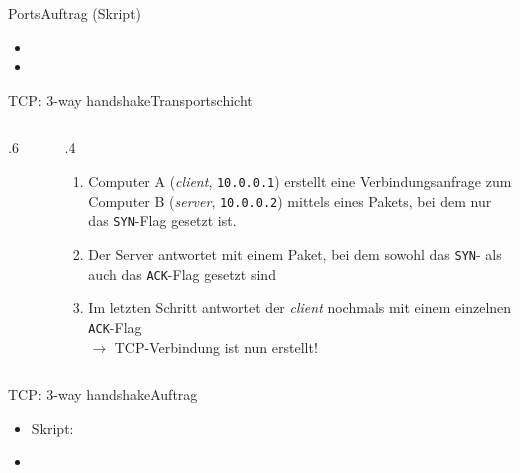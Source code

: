 \begin{frame}{\faShip{} Ports}{Auftrag (Skript)}
    \begin{itemize}
        \item {}
        \item {}
    \end{itemize}
\end{frame}

\begin{frame}[fragile]{\faHandshake{} \acrshort{TCP}: 3-way handshake}{Transportschicht}
    \begin{columns}[c]
        \begin{column}{.6\textwidth}
            \begin{figure}[H]
                \centering
            \end{figure}
        \end{column}\vrule{}
        \begin{column}{.4\textwidth}
            \footnotesize
            \begin{enumerate}
                \item Computer A (\textit{client}, \texttt{10.0.0.1}) erstellt eine Verbindungsanfrage zum Computer B (\textit{server}, \texttt{10.0.0.2}) mittels eines Pakets, bei dem nur das \texttt{SYN}-Flag gesetzt ist.
                \item Der Server antwortet mit einem Paket, bei dem sowohl das \texttt{SYN}- als auch das \texttt{ACK}-Flag gesetzt sind
                \item Im letzten Schritt antwortet der \textit{client} nochmals mit einem einzelnen \texttt{ACK}-Flag\\
                      $\rightarrow$ \acrshort{TCP}-Verbindung ist nun erstellt!
            \end{enumerate}
        \end{column}
    \end{columns}
\end{frame}

\begin{frame}[fragile]{\faHandshake{} \acrshort{TCP}: 3-way handshake}{Auftrag}
    \begin{itemize}
        \item Skript: 
        \item {}
    \end{itemize}
\end{frame}


